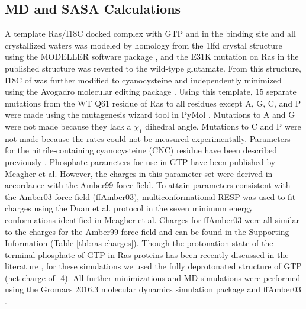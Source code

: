 \subsection{MD and SASA Calculations} 

A template Ras/\RalB{}I18C docked complex with GTP and  in the binding site and all crystallized waters was modeled by homology from the 1lfd crystal structure\cite{Huang1998} using the MODELLER software package \cite{Marti-Renom2000, Sali1993, Fiser2000}, and the E31K mutation on Ras in the published structure was reverted to the wild-type glutamate. 
From this structure, I18C of \RalB{} was further modified to cyanocysteine and independently minimized using the Avogadro molecular editing package \cite{Hanwell2012}. 
Using this template, 15 separate mutations from the WT Q61 residue of Ras to all residues except A, G, C, and P were made using the mutagenesis wizard tool in PyMol \cite{DeLano2002}.
Mutations to A and G were not made because they lack a $\chi_1$ dihedral angle. 
Mutations to C and P were not made because the rates could not be measured experimentally.
Parameters for the nitrile-containing cyanocysteine (CNC) residue have been described previously \cite{Stafford2010, Ensign2011}.
Phosphate parameters for use in GTP have been published by Meagher et al\cite{Meagher2003}.
However, the charges in this parameter set were derived in accordance with the Amber99 force field. 
To attain parameters consistent with the Amber03 force field (ffAmber03), multiconformational RESP\cite{Cornell1993, Bayly1993, Cieplak1995} was used to fit charges using the Duan et al. protocol\cite{Duan2003} in the seven minimum energy conformations identified in Meagher et al. 
Charges for ffAmber03 were all similar to the charges for the Amber99 force field and can be found in the Supporting Information (Table \ref{tbl:ras-charges}). 
Though the protonation state of the terminal phosphate of GTP in Ras proteins has been recently discussed in the literature \cite{Knihtila2015, Mann2018}, for these simulations we used the fully deprotonated structure of GTP (net charge of -4). 
All further minimizations and MD simulations were performed using the Gromacs 2016.3 molecular dynamics simulation package\cite{Berendsen1995, Lindahl2001, VanDerSpoel2005, Miyake-Stoner2009, Hess2008, Pronk2013, Pall2015, Abraham2015} and ffAmber03 \cite{Duan2003, Sorin2005}.

